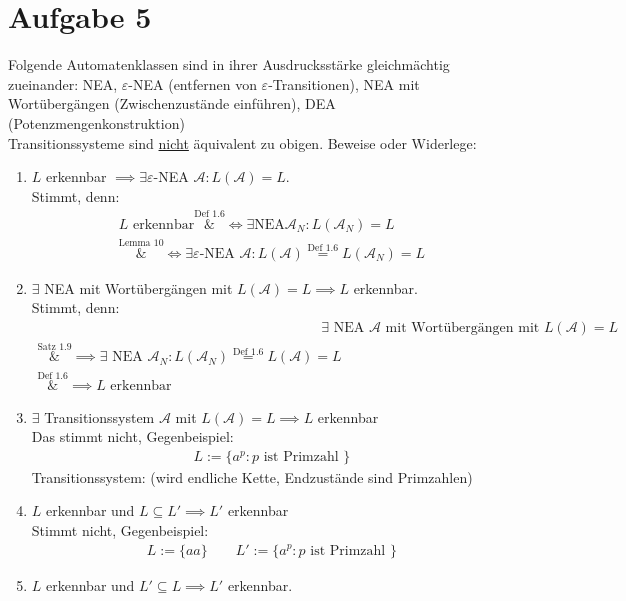 \documentclass[12pt,a4paper]{article}
\newcommand{\A}{\mathcal{A}}
\begin{document}
\section*{Aufgabe 5}
Folgende Automatenklassen sind in ihrer Ausdrucksstärke gleichmächtig zueinander:
NEA, $\varepsilon$-NEA (entfernen von $\varepsilon$-Transitionen), NEA mit Wortübergängen (Zwischenzustände einführen), DEA (Potenzmengenkonstruktion)\\
Transitionssysteme sind \underline{nicht} äquivalent zu obigen.\nl
Beweise oder Widerlege:
\begin{enumerate}[label=\alph*)]
	\item $L$ erkennbar $\implies\exists\varepsilon$-NEA $\A:L(\A)=L$.\\
	Stimmt, denn:
	\begin{align*}
		L\text{ erkennbar}
		\overset{\text{Def 1.6}}&\Longleftrightarrow
		\exists\text{NEA}\A_N:L(\A_N)=L\\
		\overset{\text{Lemma 10}}&\Longleftrightarrow
		\exists\varepsilon\text{-NEA }\A:L(\A)\overset{\text{Def 1.6}}{=}L(\A_N)=L
	\end{align*}
	\item $\exists$ NEA mit Wortübergängen mit $L(\A)=L\implies L$ erkennbar.\\
	Stimmt, denn:
	\begin{align*}
		&\exists\text{ NEA $\A$ mit Wortübergängen mit }L(\A)=L\\
		\overset{\text{Satz 1.9}}&\implies
		\exists\text{ NEA }\A_N:L(\A_N)\overset{\text{Def 1.6}}=L(\A)=L\\
		\overset{\text{Def 1.6}}&\implies
		L\text{ erkennbar}
	\end{align*}
	\item $\exists$ Transitionssystem $\A$ mit $L(\A)=L\implies L$ erkennbar\\
	Das stimmt nicht, Gegenbeispiel:
	\begin{align*}
		L:=\Big\lbrace a^p:p\text{ ist Primzahl }\Big\rbrace
	\end{align*}
	Transitionssystem: (wird endliche Kette, Endzustände sind Primzahlen)
	\item $L$ erkennbar und $L\subseteq L'\implies L'$ erkennbar\\
	Stimmt nicht, Gegenbeispiel:
	\begin{align*}
		L:=\lbrace aa\rbrace\qquad
		L':=\Big\lbrace a^p:p\text{ ist Primzahl }\Big\rbrace
	\end{align*}
	\item $L$ erkennbar und $L'\subseteq L\implies L'$ erkennbar.\\

\end{enumerate}
\end{document}
